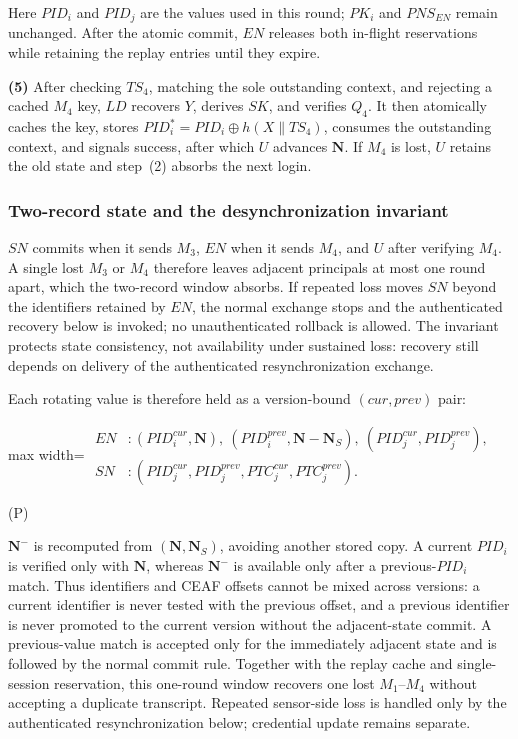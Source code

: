 \documentclass[cmc,article,submit,moreauthors,pdftex]{Definitions/tsp}
\newcommand{\cc}{\mathbin{\|}}
\newcounter{protoeq}
\newenvironment{ceq}{%
  \refstepcounter{protoeq}%
  \par\vspace{-3pt}\setlength{\topsep}{0pt}\setlength{\partopsep}{0pt}\begin{center}%
}{%
  \hspace{0.45em}\textup{(P\theprotoeq)}%
  \end{center}\vspace{-3pt}%
}
\begin{document}
Here $PID_i$ and $PID_j$ are the values used in this round; $PK_i$ and $PNS_{EN}$ remain unchanged. After the atomic commit, $EN$ releases both in-flight reservations while retaining the replay entries until they expire.

\textbf{(5)} After checking $TS_4$, matching the sole outstanding context, and rejecting a cached $M_4$ key, $LD$ recovers $Y$, derives $SK$, and verifies $Q_4$. It then atomically caches the key, stores $PID_i^{*}=PID_i\oplus h(X\cc TS_4)$, consumes the outstanding context, and signals success, after which $U$ advances $\mathbf{N}$. If $M_4$ is lost, $U$ retains the old state and step~(2) absorbs the next login.

\subsubsection{Two-record state and the desynchronization invariant}\label{sec:desync}

$SN$ commits when it sends $M_3$, $EN$ when it sends $M_4$, and $U$ after verifying $M_4$. A single lost $M_3$ or $M_4$ therefore leaves adjacent principals at most one round apart, which the two-record window absorbs. If repeated loss moves $SN$ beyond the identifiers retained by $EN$, the normal exchange stops and the authenticated recovery below is invoked; no unauthenticated rollback is allowed. The invariant protects state consistency, not availability under sustained loss: recovery still depends on delivery of the authenticated resynchronization exchange.

Each rotating value is therefore held as a version-bound $(cur,prev)$ pair:

\begin{ceq}
\begin{adjustbox}{max width=\columnwidth}
$\displaystyle\begin{aligned}
EN&: (PID_i^{cur},\mathbf{N}),\ (PID_i^{prev},\mathbf{N}-\mathbf{N}_S),\ (PID_j^{cur},PID_j^{prev}),\\
SN&: (PID_j^{cur},PID_j^{prev},PTC_j^{cur},PTC_j^{prev}).
\end{aligned}$
\end{adjustbox}
\end{ceq}

$\mathbf{N}^{-}$ is recomputed from $(\mathbf{N},\mathbf{N}_S)$, avoiding another stored copy. A current $PID_i$ is verified only with $\mathbf{N}$, whereas $\mathbf{N}^{-}$ is available only after a previous-$PID_i$ match. Thus identifiers and CEAF offsets cannot be mixed across versions: a current identifier is never tested with the previous offset, and a previous identifier is never promoted to the current version without the adjacent-state commit. A previous-value match is accepted only for the immediately adjacent state and is followed by the normal commit rule. Together with the replay cache and single-session reservation, this one-round window recovers one lost $M_1$--$M_4$ without accepting a duplicate transcript. Repeated sensor-side loss is handled only by the authenticated resynchronization below; credential update remains separate.
\end{document}
